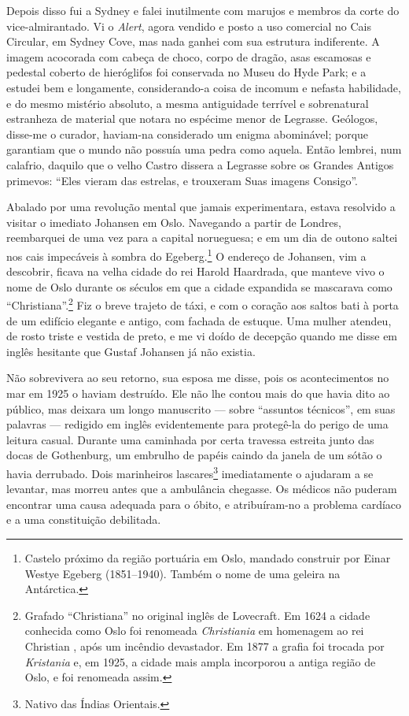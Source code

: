 Depois disso fui a Sydney e falei inutilmente com marujos e membros da
corte do vice-almirantado. Vi o \emph{Alert}, agora vendido e posto a
uso comercial no Cais Circular, em Sydney Cove, mas nada ganhei com sua
estrutura indiferente. A imagem acocorada com cabeça de choco, corpo de
dragão, asas escamosas e pedestal coberto de hieróglifos foi conservada
no Museu do Hyde Park; e a estudei bem e longamente, considerando-a
coisa de incomum e nefasta habilidade, e do mesmo mistério absoluto, a
mesma antiguidade terrível e sobrenatural estranheza de material que
notara no espécime menor de Legrasse. Geólogos, disse-me o curador,
haviam-na considerado um enigma abominável; porque garantiam que o mundo
não possuía uma pedra como aquela. Então lembrei, num calafrio, daquilo
que o velho Castro dissera a Legrasse sobre os Grandes Antigos primevos:
``Eles vieram das estrelas, e trouxeram Suas imagens Consigo''.

Abalado por uma revolução mental que jamais experimentara, estava
resolvido a visitar o imediato Johansen em Oslo. Navegando a partir de
Londres, reembarquei de uma vez para a capital norueguesa; e em um dia
de outono saltei nos cais impecáveis à sombra do Egeberg.\footnote{Castelo
  próximo da região portuária em Oslo, mandado construir por Einar
  Westye Egeberg (1851--1940). Também o nome de uma geleira na
  Antárctica.} O endereço de Johansen, vim a descobrir, ficava na velha
cidade do rei Harold Haardrada, que manteve vivo o nome de Oslo durante
os séculos em que a cidade expandida se mascarava como
``Christiana''.\footnote{Grafado ``Christiana'' no original inglês de
  Lovecraft. Em 1624 a cidade conhecida como Oslo foi renomeada
  \emph{Christiania} em homenagem ao rei Christian , após um incêndio
  devastador. Em 1877 a grafia foi trocada por \emph{Kristania} e, em
  1925, a cidade mais ampla incorporou a antiga região de Oslo, e foi
  renomeada assim.} Fiz o breve trajeto de táxi, e com o coração aos
saltos bati à porta de um edifício elegante e antigo, com fachada de
estuque. Uma mulher atendeu, de rosto triste e vestida de preto, e me vi
doído de decepção quando me disse em inglês hesitante que Gustaf
Johansen já não existia.

Não sobrevivera ao seu retorno, sua esposa me disse, pois os
acontecimentos no mar em 1925 o haviam destruído. Ele não lhe contou
mais do que havia dito ao público, mas deixara um longo manuscrito ---
sobre ``assuntos técnicos'', em suas palavras --- redigido em inglês
evidentemente para protegê-la do perigo de uma leitura casual. Durante
uma caminhada por certa travessa estreita junto das docas de Gothenburg,
um embrulho de papéis caindo da janela de um sótão o havia derrubado.
Dois marinheiros lascares\footnote{Nativo das Índias Orientais.}
imediatamente o ajudaram a se levantar, mas morreu antes que a
ambulância chegasse. Os médicos não puderam encontrar uma causa adequada
para o óbito, e atribuíram-no a problema cardíaco e a uma constituição
debilitada.

